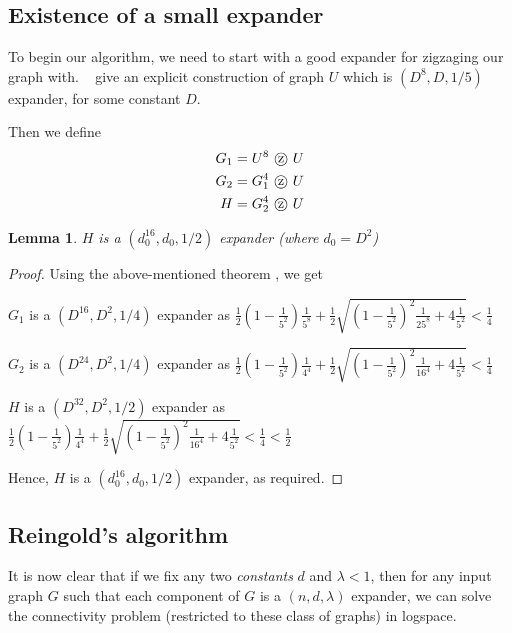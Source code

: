 \documentclass[10pt]{article}
\theoremstyle{plain}
\newtheorem{lemma}[theorem]{Lemma}
\theoremstyle{definition}
\begin{document}
\subsection{Existence of a small expander}

To begin our algorithm, we need to start with a good expander for zigzaging our graph with. ~\cite{DBLP:journals/eccc/ECCC-TR01-018} give an explicit construction of graph $U$ which is $(D^{8}, D, 1/5)$ expander, for some constant $D$.

Then we define 
\begin{align*}
    G_1 &= U^8 \text{ \textcircled{z} } U \\
    G_2 &= G_1^4 \text{ \textcircled{z} } U \\
    H &= G_2^4 \text{ \textcircled{z} } U \\
\end{align*}

\begin{lemma}
$H$ is a $(d_0^{16}, d_0, 1/2)$ expander (where $d_0 = D^2$)
\end{lemma}

\begin{proof}
Using the above-mentioned theorem , we get

$G_1$ is a $(D^{16}, D^2, 1/4)$ expander as $\frac12 (1 - \frac{1}{5^2})\frac{1}{5^8} + \frac12 \sqrt{(1 - \frac{1}{5^2})^2\frac{1}{25^8} + 4\frac{1}{5^2}} < \frac14$

$G_2$ is a $(D^{24}, D^2, 1/4)$ expander as $\frac12 (1 - \frac{1}{5^2})\frac{1}{4^4} + \frac12 \sqrt{(1 - \frac{1}{5^2})^2\frac{1}{16^4} + 4\frac{1}{5^2}} < \frac14$

$H$ is a $(D^{32}, D^2, 1/2)$ expander as $\frac12 (1 - \frac{1}{5^2})\frac{1}{4^4} + \frac12 \sqrt{(1 - \frac{1}{5^2})^2\frac{1}{16^4} + 4\frac{1}{5^2}} < \frac14 < \frac12$

Hence, $H$ is a $(d_0^{16}, d_0, 1/2)$ expander, as required.
\end{proof}


\subsection{Reingold's algorithm}

It is now clear that if we fix any two \textsl{constants} $d$ and $\lambda < 1$, then for any input graph $G$ such that each component of $G$ is a $(n,d,\lambda)$ expander, we can solve the connectivity problem (restricted to these class of graphs) in logspace.
\end{document}
